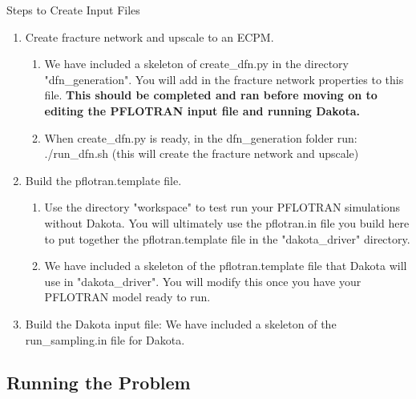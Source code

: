 \documentclass{beamer}
\begin{document}
\begin{frame}[fragile]{Steps to Create Input Files}
  
\begin{enumerate}
  \item Create fracture network and upscale to an ECPM.
  \begin{enumerate}
    \item We have included a skeleton of create\_dfn.py in the directory  "dfn\_generation". You will add in the fracture network properties to this file. \textbf{This should be completed and ran before moving on to editing the PFLOTRAN input file and running Dakota.}
    \item When create\_dfn.py is ready, in the dfn\_generation folder run: ./run\_dfn.sh (this will create the fracture network and upscale)
  \end{enumerate}
  \item Build the pflotran.template file.
  \begin{enumerate}
    \item  Use the directory "workspace" to test run your PFLOTRAN simulations without Dakota. You will ultimately use the pflotran.in file you build here to put together the pflotran.template file in the "dakota\_driver" directory.
    \item  We have included a skeleton of the pflotran.template file that Dakota will use in "dakota\_driver". You will modify this once you have your PFLOTRAN model ready to run.
  \end{enumerate}
  \item Build the Dakota input file: We have included a skeleton of the run\_sampling.in file for Dakota.
\end{enumerate}


\end{frame}


\subsection{Running the Problem}
\end{document}
